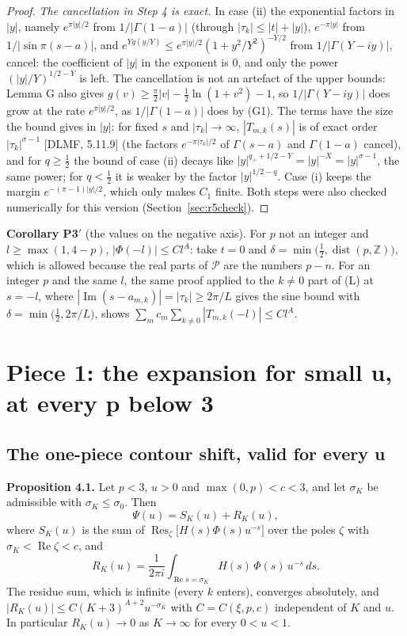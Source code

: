 \documentclass[11pt]{article}
\newcommand{\re}{\operatorname{Re}}
\newcommand{\im}{\operatorname{Im}}
\newcommand{\Res}{\operatorname{Res}}
\newcommand{\dist}{\operatorname{dist}}
\begin{document}
\begin{proof}
\emph{The cancellation in Step 4 is exact.} In case (ii) the exponential factors in $|y|$, namely $e^{\pi|y|/2}$ from $1/|\Gamma(1-a)|$ (through $|\tau_k|\le|t|+|y|$), $e^{-\pi|y|}$ from $1/|\sin\pi(s-a)|$, and $e^{Yg(y/Y)}\le e^{\pi|y|/2}(1+y^2/Y^2)^{-Y/2}$ from $1/|\Gamma(Y-iy)|$, cancel: the coefficient of $|y|$ in the exponent is $0$, and only the power $(|y|/Y)^{1/2-Y}$ is left. The cancellation is not an artefact of the upper bounds: Lemma G also gives $g(v)\ge\frac\pi2|v|-\frac12\ln(1+v^2)-1$, so $1/|\Gamma(Y-iy)|$ does grow at the rate $e^{\pi|y|/2}$, as $1/|\Gamma(1-a)|$ does by (G1). The terms have the size the bound gives in $|y|$: for fixed $s$ and $|\tau_k|\to\infty$, $|T_{m,k}(s)|$ is of exact order $|\tau_k|^{\sigma-1}$ [DLMF, 5.11.9] (the factors $e^{-\pi|\tau_k|/2}$ of $\Gamma(s-a)$ and $\Gamma(1-a)$ cancel), and for $q\ge\frac12$ the bound of case (ii) decays like $|y|^{q_++1/2-Y}=|y|^{-X}=|y|^{\sigma-1}$, the same power; for $q<\frac12$ it is weaker by the factor $|y|^{1/2-q}$. Case (i) keeps the margin $e^{-(\pi-1)|y|/2}$, which only makes $C_1$ finite. Both steps were also checked numerically for this version (Section~\ref{sec:r5check}).
\end{proof}

\noindent\textbf{Corollary P3$'$} (the values on the negative axis). For $p$ not an integer and $l\ge\max(1,4-p)$, $|\Phi(-l)|\le Cl^A$: take $t=0$ and $\delta=\min\bigl(\frac12,\dist(p,\mathbb{Z})\bigr)$, which is allowed because the real parts of $\mathcal{P}$ are the numbers $p-n$. For an integer $p$ and the same $l$, the same proof applied to the $k\ne0$ part of (L) at $s=-l$, where $|\im(s-a_{m,k})|=|\tau_k|\ge2\pi/L$ gives the sine bound with $\delta=\min\bigl(\frac12,2\pi/L\bigr)$, shows $\sum_mc_m\sum_{k\ne0}|T_{m,k}(-l)|\le Cl^A$.

\section{Piece 1: the expansion for small u, at every p below 3}\label{sec:P1}

\subsection{The one-piece contour shift, valid for every u}

\noindent\textbf{Proposition 4.1.} Let $p<3$, $u>0$ and $\max(0,p)<c<3$, and let $\sigma_K$ be admissible with $\sigma_K\le\sigma_0$. Then
\[
\Psi(u)=S_K(u)+R_K(u),
\]
where $S_K(u)$ is the sum of $\Res_\zeta\bigl[H(s)\Phi(s)u^{-s}\bigr]$ over the poles $\zeta$ with $\sigma_K<\re\zeta<c$, and
\[
R_K(u)=\frac{1}{2\pi i}\int_{\re s=\sigma_K}H(s)\,\Phi(s)\,u^{-s}\,ds.
\]
The residue sum, which is infinite (every $k$ enters), converges absolutely, and $|R_K(u)|\le C(K+3)^{A+2}u^{-\sigma_K}$ with $C=C(\xi,p,c)$ independent of $K$ and $u$. In particular $R_K(u)\to0$ as $K\to\infty$ for every $0<u<1$.
\end{document}
